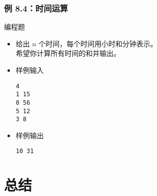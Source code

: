 \begin{frame}[fragile]
    \frametitle{例 8.4：时间运算}

     {
         {}
         {
            
        }
    } {
        \begin{exampleblock}{编程题}
            \begin{itemize}
                \item 给出 $n$ 个时间，每个时间用小时和分钟表示。\\
                    希望你计算所有时间的和并输出。

                \item 样例输入
    
                    \lstinline|4|\\
                    \lstinline|1 15|\\
                    \lstinline|0 56|\\
                    \lstinline|5 12|\\
                    \lstinline|3 8|

                \item 样例输出
                
                    \lstinline|10 31|
    
            \end{itemize}
        \end{exampleblock}
    }

\end{frame}


\section{总结}

